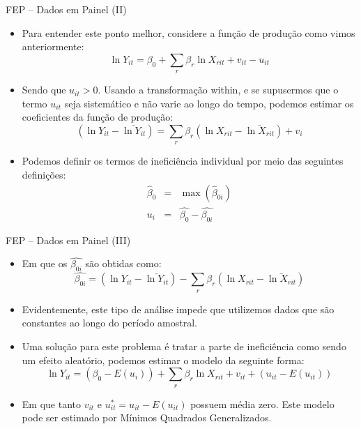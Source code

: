\documentclass{beamer}
\begin{document}
\begin{frame}{FEP -- Dados em Painel (II)}

\begin{itemize}
\item Para entender este ponto melhor, considere a função de produção como
vimos anteriormente:
\[
\ln Y_{it}=\beta_{0}+\sum_{r}\beta_{r}\ln X_{rit}+v_{it}-u_{it}
\]
\item Sendo que $u_{it}>0$. Usando a transformação within, e se supusermos
que o termo $u_{it}$ seja sistemático e não varie ao longo do tempo,
podemos estimar os coeficientes da função de produção:
\[
(\ln Y_{it}-\bar{\ln Y_{it}})=\sum_{r}\beta_{r}(\ln X_{rit}-\bar{\ln X_{rit}})+v_{i}
\]
\item Podemos definir os termos de ineficiência individual por meio das
seguintes definições:
\begin{eqnarray*}
\hat{\beta}_{0} & = & \max(\hat{\beta}_{0i})\\
u_{i} & = & \hat{\beta_{0}}-\hat{\beta_{0i}}
\end{eqnarray*}
\end{itemize}
\end{frame}

\begin{frame}{FEP -- Dados em Painel (III)}

\begin{itemize}
\item Em que os $\hat{\beta_{0i}}$ são obtidas como:
\[
\hat{\beta_{0i}}=(\ln Y_{it}-\bar{\ln Y_{it}})-\sum_{r}\beta_{r}(\ln X_{rit}-\bar{\ln X_{rit}})
\]
\item Evidentemente, este tipo de análise impede que utilizemos dados que
são constantes ao longo do período amostral. 
\item Uma solução para este problema é tratar a parte de ineficiência como
sendo um efeito aleatório, podemos estimar o modelo da seguinte forma:
\[
\ln Y_{it}=(\beta_{0}-E(u_{i}))+\sum_{r}\beta_{r}\ln X_{rit}+v_{it}+(u_{it}-E(u_{it}))
\]
\item Em que tanto $v_{it}$ e $u_{it}^{*}=u_{it}-E(u_{it})$ possuem média
zero. Este modelo pode ser estimado por Mínimos Quadrados Generalizados. 
\end{itemize}




\end{frame}
\end{document}
